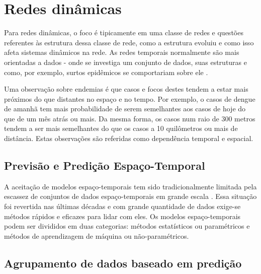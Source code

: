 \section{Redes dinâmicas}
 \label{chap:redes-dinamicas}
 
Para redes dinâmicas, o foco é tipicamente em uma classe de redes e questões referentes às estrutura dessa classe de rede, como a estrutura evoluiu e como isso afeta sistemas dinâmicos na rede. As redes temporais normalmente são mais orientadas a dados - onde se investiga um conjunto de dados, suas estruturas e como, por exemplo, surtos epidêmicos se comportariam sobre ele \cite{holme:colloquium}.

Uma observação sobre endemias é que casos e focos destes tendem a estar mais próximos do que distantes no espaço e no tempo. Por exemplo, o casos de dengue de amanhã tem mais probabilidade de serem semelhantes aos casos de hoje do que de um mês atrás ou mais. Da mesma forma, os casos num raio de 300 metros tendem a ser mais semelhantes do que os casos a 10 quilômetros ou mais de distância. Estas observações são referidas como dependência temporal e espacial.

\subsection{Previsão e Predição Espaço-Temporal}
A aceitação de modelos espaço-temporais tem sido tradicionalmente limitada pela escassez de conjuntos de dados espaço-temporais em grande escala \cite{Griffith2010}. Essa situação foi revertida nas últimas décadas e com grande quantidade de dados exige-se métodos rápidos e eficazes para lidar com eles. Os modelos espaço-temporais 
podem ser divididos em duas categorias: métodos estatísticos ou paramétricos e métodos de aprendizagem de máquina ou não-paramétricos.


\subsection{Agrupamento de dados baseado em predição}

